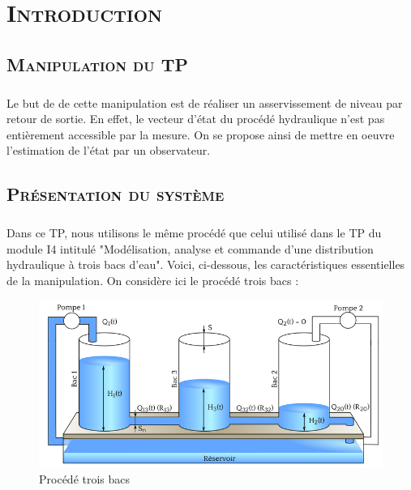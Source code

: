 \chapter*{\textsc {Introduction}}

	\section{\textsc {Manipulation du TP}}
	
\paragraph{}	 
Le but de de cette manipulation est de réaliser un asservissement de niveau par retour de sortie. En effet, le vecteur d'état du procédé hydraulique n'est pas entièrement accessible par la mesure. On se propose ainsi de mettre en oeuvre l'estimation de l'état par un observateur.

\section{ \textsc{Présentation du système}}
\paragraph{}
Dans ce TP, nous utilisons le même procédé que celui utilisé dans le TP du module I4 intitulé "Modélisation, analyse et commande d'une distribution hydraulique à trois bacs d'eau". Voici, ci-dessous, les caractéristiques essentielles de la manipulation. On considère ici le procédé trois bacs :

\begin{figure}
\centering
\includegraphics[scale = 0.5]{bac-deau.png}
\caption{Procédé trois bacs}
\label{fig11}
\end{figure}
 
